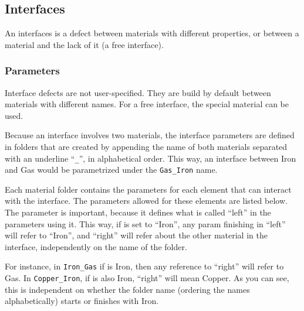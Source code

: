 \subsection{Interfaces}

An interfaces is a defect between materials with different properties, or between a material and the lack of it (a free interface).

\subsubsection{Parameters}

Interface defects are not user-specified. They are build by default between materials with different names. For a free interface, the special material  can be used. 

Because an interface involves two materials, the interface parameters are defined in folders that are created by appending the name of both materials separated with an underline ``\verb+_+'', in alphabetical order. This way, an interface between Iron and Gas would be parametrized under the {\tt Gas\verb+_+Iron} name.

Each material folder contains the parameters for each element that can interact with the interface. The parameters allowed for these elements are listed below. The parameter  is important, because it defines what is called ``left'' in the parameters using it. This way, if  is set to ``Iron'', any param finishing in ``left'' will refer to ``Iron'', and ``right'' will refer about the other material in the interface, independently on the name of the folder. 

For instance, in {\tt Iron\verb+_+Gas} if  is Iron, then any reference to ``right'' will refer to Gas. In {\tt Copper\verb+_+Iron}, if  is also Iron, ``right'' will mean Copper. As you can see, this is independent on whether the folder name (ordering the names alphabetically) starts or finishes with Iron.

